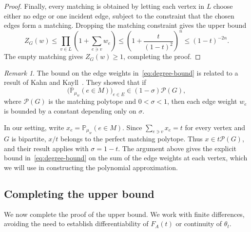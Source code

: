 \documentclass[11pt,reqno,letterpaper]{amsart}
\numberwithin{equation}{section}
\theoremstyle{definition}
\theoremstyle{remark}
\newtheorem{remark}[remark]{Remark}
\newcommand{\PP}{\mathbb P}
\begin{document}
\begin{proof}
Finally, every matching is obtained by letting each vertex in $L$
choose either no edge or one incident edge, subject to the constraint that the chosen edges form a matching. Dropping the matching constraint gives the upper bound
\[
  Z_G(w)
  \leq
  \prod_{v\in L}
  \left(1+\sum_{e\ni v}w_e\right)
  \leq
  \left(1+\frac{t}{(1-t)^2}\right)^n
  \leq
  (1-t)^{-2n}.
\]
The empty matching gives $Z_G(w)\geq1$, completing the proof.
\end{proof}

\begin{remark}
    The bound on the edge weights in~\eqref{eq:degree-bound} is
related to a result of Kahn and Kayll~\cite{KahnKayll}. They showed that if
\[
 \bigl(\PP_{\mu_w}(e\in M)\bigr)_{e\in E}
 \in(1-\sigma)\mathcal P(G),
\]
where $\mathcal P(G)$ is the matching polytope and
$0<\sigma<1$, then each edge weight $w_e$ is bounded
by a constant depending only on $\sigma$.

In our setting, write $x_e=\PP_{\mu_w}(e\in M)$. Since
$\sum_{e\ni v}x_e=t$ for every vertex and $G$ is bipartite,
$x/t$ belongs to the perfect matching polytope. Thus
$x\in t\mathcal P(G)$, and their result applies with
$\sigma=1-t$. The argument above gives the explicit bound
in~\eqref{eq:degree-bound} on the sum of the edge weights
at each vertex, which we will use in constructing the
polynomial approximation.
\end{remark}

\medskip

\subsection{Completing the upper bound}
We now complete the proof of the upper bound. We work with finite differences, avoiding the need to establish
differentiability of $F_A(t)$ or continuity of $\theta_t$.
\end{document}

